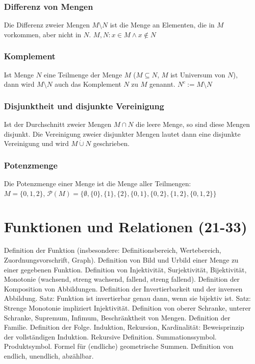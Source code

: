 \documentclass[10pt,a4paper,twoside]{article}
\begin{document}
\subsubsection{Differenz von Mengen}
Die Differenz zweier Mengen $M\setminus N$ ist die Menge an Elementen, die in $M$ vorkommen, aber nicht in $N$.
$M,N : x \in M \wedge x \notin N$

\subsubsection{Komplement}
Ist Menge $N$ eine Teilmenge der Menge $M$ ($M \subseteq N$, $M$ ist Universum von $N$), dann wird $M \setminus N$ auch das Komplement $N$ zu $M$ genannt. $N^c := M \setminus N$

\subsubsection{Disjunktheit und disjunkte Vereinigung}
Ist der Durchschnitt zweier Mengen $M \cap N$ die leere Menge, so sind diese Mengen disjunkt. Die Vereinigung zweier disjunkter Mengen lautet dann eine disjunkte Vereinigung und wird $M \dot{\cup} N$ geschrieben.

\subsubsection{Potenzmenge}
Die Potenzmenge einer Menge ist die Menge aller Teilmengen:\\
$M = \{0,1,2\}$, $\mathcal{P}(M)= \{\emptyset, \{0\}, \{1\}, \{2\}, \{0,1\}, \{0,2\}, \{1,2\}, \{0,1,2\}\}$


\section{Funktionen und Relationen (21-33)}
  
Definition der Funktion (insbesondere: Definitionsbereich, Wertebereich, Zuordnungsvorschrift, Graph). Definition von Bild und Urbild einer Menge zu einer gegebenen Funktion. Definition von Injektivität, Surjektivität, Bijektivität, Monotonie (wachsend, streng wachsend, fallend, streng fallend). Definition der Komposition von Abbildungen. Definition der Invertierbarkeit und der inversen Abbildung. Satz: Funktion ist invertierbar genau dann, wenn sie bijektiv ist. Satz: Strenge Monotonie impliziert Injektivität. Definition von oberer Schranke, unterer Schranke, Supremum, Infimum, Beschränktheit von Mengen. Definition der Familie. Definition der Folge. 
Induktion, Rekursion, Kardinalität: 
Beweisprinzip der vollständigen Induktion. Rekursive Definition. Summationssymbol. Produktsymbol. Formel für (endliche) geometrische Summen. Definition von endlich, unendlich, abzählbar. 
\end{document}
